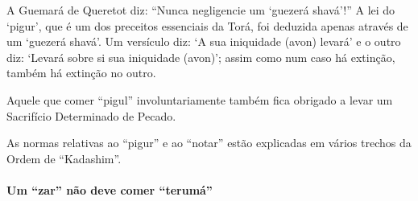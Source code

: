 A Guemará de Queretot diz: ``Nunca negligencie um `guezerá shavá'!'' A
lei do `pigur', que é um dos preceitos essenciais da Torá, foi deduzida
apenas através de um `guezerá shavá'. Um versículo diz: `A sua
iniquidade (avon) levará' e o outro diz: `Levará sobre si sua iniquidade
(avon)'; assim como num caso há extinção, também há extinção no outro.

Aquele que comer ``pigul'' involuntariamente também fica obrigado a
levar um Sacrifício Determinado de Pecado.

As normas relativas ao ``pigur'' e ao ``notar'' estão explicadas em
vários trechos da Ordem de ``Kadashim''.

\paragraph{Um ``zar'' não deve comer ``terumá''}

